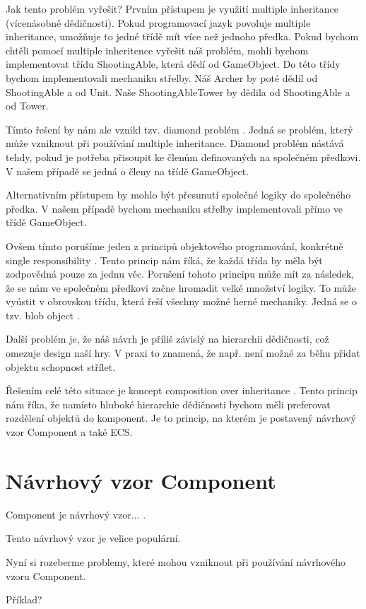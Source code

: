 Jak tento problém vyřešit? Prvním přístupem je využití multiple inheritance  (vícenásobné dědičnosti). Pokud programovací jazyk povoluje multiple inheritance, umožňuje to jedné třídě mít více než jednoho předka. Pokud bychom chtěli pomocí multiple inheritence vyřešit náš problém, mohli bychom implementovat třídu ShootingAble, která dědí od GameObject. Do této třídy bychom implementovali mechaniku střelby. Náš Archer by poté dědil od ShootingAble a od Unit. Naše ShootingAbleTower by dědila od ShootingAble a od Tower.

Tímto řešení by nám ale vznikl tzv. diamond problém . Jedná se problém, který může vzniknout při používání multiple inheritance. Diamond problém nástává tehdy, pokud je potřeba přisoupit ke členům definovaných na společném předkovi. V našem případě se jedná o členy na třídě GameObject.

Alternativním přístupem by mohlo být přesunutí společné logiky do společného předka. V našem případě bychom mechaniku střelby implementovali přímo ve třídě GameObject.

Ovšem tímto porušíme jeden z principů objektového programování, konkrétně single responsibility . Tento princip nám říká, že každá třída by měla být zodpovědná pouze za jednu věc. Porušení tohoto principu může mít za následek, že se nám ve společném předkovi začne hromadit velké množství logiky. To může vyústit v obrovskou třídu, která řeší všechny možné herné mechaniky. Jedná se o tzv. blob object . 

Další problém je, že náš návrh je příliš závislý na hierarchii dědičnosti, což omezuje design naší hry. V praxi to znamená, že např. není možné za běhu přidat objektu schopnost střílet.

Řešením celé této situace je koncept composition over inheritance . Tento princip nám říka, že namísto hluboké hierarchie dědičnosti bychom měli preferovat rozdělení objektů do komponent. Je to princip, na kterém je postavený návrhový vzor Component a také ECS.


\section{Návrhový vzor Component}
\label{sec:component}
Component je návrhový vzor... .

Tento návrhový vzor je velice populární.

Nyní si rozeberme problemy, které mohou vzniknout při používání návrhového vzoru Component.

Příklad?